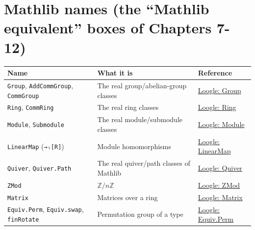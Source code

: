 \section*{Mathlib names (the ``Mathlib equivalent'' boxes of Chapters 7-12)}
\label{sec:root:tactic-and-library-reference:4}

\begin{longtable}[]{@{}
  >{\raggedright\arraybackslash}p{}
  >{\raggedright\arraybackslash}p{}
  >{\raggedright\arraybackslash}p{}@{}}
\toprule\noalign{}
\begin{minipage}[b]{\linewidth}\raggedright
Name
\end{minipage} & \begin{minipage}[b]{\linewidth}\raggedright
What it is
\end{minipage} & \begin{minipage}[b]{\linewidth}\raggedright
Reference
\end{minipage} \\
\midrule\noalign{}
\endhead
\bottomrule\noalign{}
\endlastfoot
\texttt{Group}, \texttt{AddCommGroup}, \texttt{CommGroup} & The real group/abelian-group classes & \href{https://loogle.lean-lang.org/?q=Group}{Loogle: Group} \\
\texttt{Ring}, \texttt{CommRing} & The real ring classes & \href{https://loogle.lean-lang.org/?q=Ring}{Loogle: Ring} \\
\texttt{Module}, \texttt{Submodule} & The real module/submodule classes & \href{https://loogle.lean-lang.org/?q=Module}{Loogle: Module} \\
\texttt{LinearMap} (\texttt{→ₗ[R]}) & Module homomorphisms & \href{https://loogle.lean-lang.org/?q=LinearMap}{Loogle: LinearMap} \\
\texttt{Quiver}, \texttt{Quiver.Path} & The real quiver/path classes of Mathlib & \href{https://loogle.lean-lang.org/?q=Quiver}{Loogle: Quiver} \\
\texttt{ZMod} & \(\mathbb{Z}/n\mathbb{Z}\) & \href{https://loogle.lean-lang.org/?q=ZMod}{Loogle: ZMod} \\
\texttt{Matrix} & Matrices over a ring & \href{https://loogle.lean-lang.org/?q=Matrix}{Loogle: Matrix} \\
\texttt{Equiv.Perm}, \texttt{Equiv.swap}, \texttt{finRotate} & Permutation group of a type & \href{https://loogle.lean-lang.org/?q=Equiv.Perm}{Loogle: Equiv.Perm} \\

\end{longtable}
